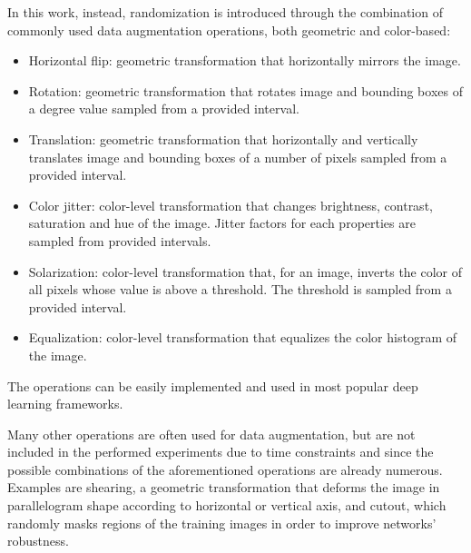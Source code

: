 \documentclass[%
    corpo=12pt,
    twoside,
    stile=classica,   
    tipotesi=magistrale,
    evenboxes,
    english,
	numerazioneromana,
]{toptesi}
\begin{document}
In this work, instead, randomization is introduced through the combination of commonly used data augmentation operations, both geometric and color-based:
\begin{itemize}
	\item Horizontal flip: geometric transformation that horizontally mirrors the image.
	\item Rotation: geometric transformation that rotates image and bounding boxes of a degree value sampled from a provided interval.
	\item Translation: geometric transformation that horizontally and vertically translates image and bounding boxes of a number of pixels sampled from a provided interval.
	\item Color jitter: color-level transformation that changes brightness, contrast, saturation and hue of the image. Jitter factors for each properties are sampled from provided intervals.
	\item Solarization: color-level transformation that, for an image, inverts the color of all pixels whose value is above a threshold. The threshold is sampled from a provided interval.
	\item Equalization: color-level transformation that equalizes the color histogram of the image.
\end{itemize}
The operations can be easily implemented and used in most popular deep learning frameworks.

Many other operations are often used for data augmentation, but are not included in the performed experiments due to time constraints and since the possible combinations of the aforementioned operations are already numerous. Examples are shearing, a geometric transformation that deforms the image in parallelogram shape according to horizontal or vertical axis,
and cutout, which randomly masks regions of the training images in order to improve networks' robustness.
\end{document}
